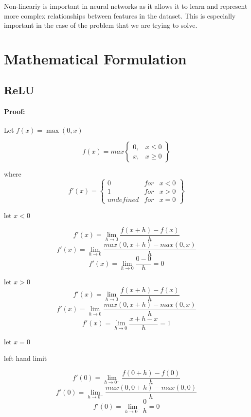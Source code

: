 \documentclass[12pt,a4paper]{article}
\begin{document}
     Non-lineariy is important in neural networks as it allows it to learn
     and represent more complex relationships between features in the dataset.
     This is especially important in the case of the problem that we are trying to solve.



\newpage
\section{Mathematical Formulation}

\subsection{ReLU}
     \paragraph{Proof:}

     Let \( f(x) = \max(0, x) \)

     \[
     f(x) = max \begin{Bmatrix}
        0, & x \le 0 \\
        x, & x \geq 0   
     \end{Bmatrix}
    \]

    where
    \[
    f'(x) = \begin{Bmatrix}
        0 & for & x < 0 \\
        1 & for & x > 0 \\
        undefined & for & x = 0
    \end{Bmatrix}
    \]

    let \( x < 0 \)

    \[
    f'(x) = \lim_{h \to 0} \frac{f(x+h) - f(x)}{h}
    \]
    \[
    f'(x) = \lim_{h \to 0} \frac{max(0, x + h) - max(0, x)}{h}
    \]
    \[
    f'(x) = \lim_{h \to 0} \frac{0 - 0}{h} = 0
    \]

    let \( x > 0 \)
    \[
    f'(x) = \lim_{h \to 0} \frac{f(x+h) - f(x)}{h}
    \]
    \[
    f'(x) = \lim_{h \to 0} \frac{max(0, x + h) - max(0, x)}{h}
    \]
    \[
    f'(x) = \lim_{h \to 0} \frac{x + h - x}{h} = 1
    \]

    let \( x = 0 \)
    \begin{center}
    left hand limit
    \end{center}
    \[
    f'(0) = \lim_{h \to 0^-} \frac{f(0 + h) - f(0)}{h}
    \]
    \[
    f'(0) = \lim_{h \to 0^-} \frac{max(0, 0 + h) - max(0, 0)}{h}
    \]
    \[
    f'(0) = \lim_{h \to 0^-} \frac{0}{h} = 0
    \]
    
\end{document}

